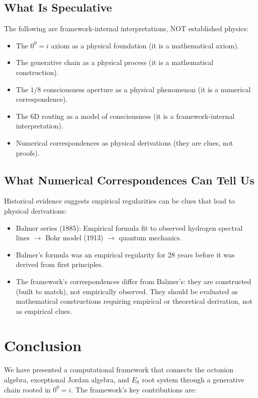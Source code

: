 \documentclass[11pt]{article}
\begin{document}
\subsection{What Is Speculative}

The following are framework-internal interpretations, NOT established physics:
\begin{itemize}
\item The $0^0 = i$ axiom as a physical foundation (it is a mathematical axiom).
\item The generative chain as a physical process (it is a mathematical construction).
\item The $1/8$ consciousness aperture as a physical phenomenon (it is a numerical correspondence).
\item The 6D routing as a model of consciousness (it is a framework-internal interpretation).
\item Numerical correspondences as physical derivations (they are clues, not proofs).
\end{itemize}

\subsection{What Numerical Correspondences Can Tell Us}

Historical evidence suggests empirical regularities can be clues that lead to physical derivations:
\begin{itemize}
\item Balmer series (1885): Empirical formula fit to observed hydrogen spectral lines $\to$ Bohr model (1913) $\to$ quantum mechanics.
\item Balmer's formula was an empirical regularity for 28 years before it was derived from first principles.
\item The framework's correspondences differ from Balmer's: they are constructed (built to match), not empirically observed. They should be evaluated as mathematical constructions requiring empirical or theoretical derivation, not as empirical clues.
\end{itemize}

\section{Conclusion}

We have presented a computational framework that connects the octonion algebra, exceptional Jordan algebra, and $E_8$ root system through a generative chain rooted in $0^0 = i$. The framework's key contributions are:
\end{document}
